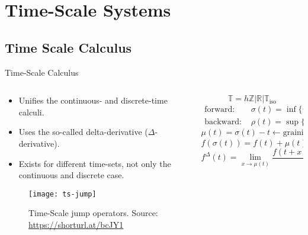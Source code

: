 
\section{Time-Scale Systems}%
\label{sec:ts-systems}

\subsection{Time Scale Calculus}%
\label{subsec:ts-calculus}

\begin{slide}{Time-Scale Calculus}
  \begin{columns}[c]
    \begin{column}{0.48\textwidth}
      \begin{itemize}
        \item Unifies the continuous- and discrete-time calculi.
        \item Uses the so-called delta-derivative (\(\Delta\)-derivative).
        \item Exists for different time-sets, not only the continuous and
              discrete case.
      \end{itemize}
      \begin{figure}[ht!]
        \centering
        \texttt{[image: ts-jump]}
        \caption{Time-Scale jump operators. Source: \url{https://shorturl.at/bcJY1}}%
      \end{figure}
    \end{column}%
    \hfill%
    \begin{column}{0.48\textwidth}
      \begin{equation}
        \mathbb{T} = h\mathbb{Z} | \mathbb{R} | \mathbb{T}_{\textrm{iso}}
      \end{equation}
      \begin{align}
        \textrm{forward:~}  & \sigma(t) = \inf\{\tau\in\mathbb{T}|\tau>t\}, \\
        \textrm{backward:~} & \rho(t) = \sup\{\tau\in\mathbb{T}|\tau<t\}.
      \end{align}
      \begin{equation}
        \mu(t) = \sigma(t)-t \leftarrow \textrm{graininess}
      \end{equation}
      \begin{equation}
        f(\sigma(t)) = f(t) + \mu(t)f^{\Delta}(t).
      \end{equation}
      \begin{equation}
        f^{\Delta}(t) = \lim_{x\rightarrow{}\mu(t)}\frac{f(t+x)-f(t)}{x}.
      \end{equation}
    \end{column}%
  \end{columns}
\end{slide}


